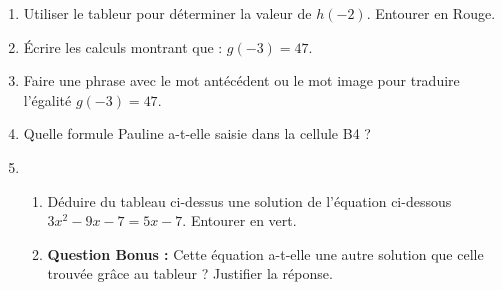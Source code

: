 \documentclass[10pt]{article}
\begin{document}
\medskip

\begin{enumerate}
\item Utiliser le tableur pour déterminer la valeur de $h(-2)$. Entourer en Rouge.
\item Écrire les calculs montrant que : $g(- 3) = 47$.


\item Faire une phrase avec le mot \og antécédent\fg{} ou le mot \og image \fg{} pour traduire
l'égalité $g(- 3) = 47$.

\item Quelle formule Pauline a-t-elle saisie dans la cellule B4 ?

\item  
	\begin{enumerate}
		\item Déduire du tableau ci-dessus une solution de l'équation ci-dessous $3x^2 - 9x - 7 = 5x - 7.$ Entourer en vert.

		\item \textbf{ Question Bonus :} Cette équation a-t-elle une autre solution que celle trouvée grâce au tableur ?
Justifier la réponse.


	\end{enumerate}
\end{enumerate}
\end{document}
